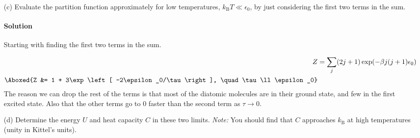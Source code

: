 \documentclass{article}
\begin{document}
\begin{enumerate}
		
		\item[(c)] Evaluate the partition function approximately for low temperatures, $k_\mathrm{B}T \ll \epsilon_0$, by just considering the first two terms in the sum.
		\paragraph{Solution} Starting with finding the first two terms in the sum.
		
		\begin{equation}
			\begin{split}
				Z &= \sum_{j} (2j + 1) \exp(-\beta j(j+1) \epsilon_0) \\
				\Aboxed{Z &= 1 + 3\exp\left[ -2\epsilon_0/\tau \right], \quad \tau \ll \epsilon_0}
			\end{split}
		\end{equation}
		The reason we can drop the rest of the terms is that most of the diatomic molecules are in their ground state, and few in the first excited state. Also that the other terms go to $0$ faster than the second term as $\tau \to 0$.
		
\clearpage
		
		\item[(d)] Determine the energy $U$ and heat capacity $C$ in these two limits. \textit{Note:} You should find that $C$ approaches $k_\mathrm{B}$ at high temperatures (unity in Kittel's units).

\end{enumerate}
\end{document}
